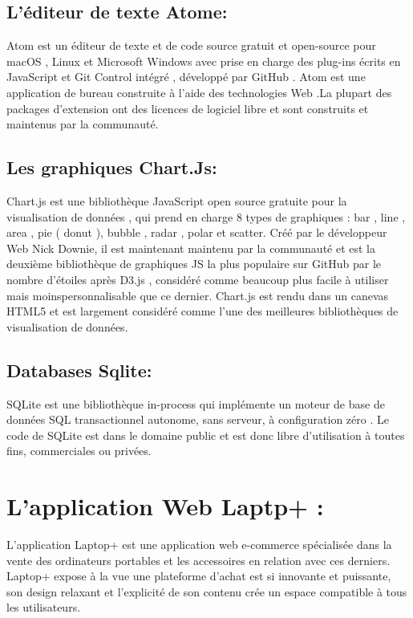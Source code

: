 \documentclass[a4paper,12pt]{report}
\begin{document}
\begin{doublespace}
\begin{doublespace}
\begin{doublespace}
\begin{doublespace}
\begin{doublespace}
\begin{doublespace}
\subsection{L'éditeur de texte Atome:} 
 \begin{figure}[H]
\end{figure}
 Atom est un éditeur de texte et de code source gratuit et open-source pour macOS , Linux et Microsoft Windows avec prise en charge des plug-ins écrits en JavaScript et Git Control intégré , développé par GitHub . Atom est une application de bureau construite à l'aide des technologies Web .La plupart des packages d'extension ont des licences de logiciel libre et sont construits et maintenus par la communauté. 
  \newpage
\subsection{ Les graphiques Chart.Js:}  
   \begin{figure}[H]
\end{figure}
 Chart.js est une bibliothèque JavaScript open source gratuite pour la visualisation de données , qui prend en charge 8 types de graphiques : bar , line , area , pie ( donut ), bubble , radar , polar et scatter. Créé par le développeur Web  Nick Downie, il est maintenant maintenu par la communauté et est la deuxième bibliothèque de graphiques JS la plus populaire sur GitHub par le nombre d'étoiles après D3.js , considéré comme beaucoup plus facile à utiliser mais moinspersonnalisable que ce dernier. Chart.js est rendu dans un canevas HTML5 et est largement considéré comme l'une des meilleures bibliothèques de visualisation de données. 
\subsection{Databases Sqlite:}
\begin{figure}[H]
\end{figure}
SQLite est une bibliothèque in-process qui implémente un moteur de base de données SQL transactionnel autonome, sans serveur, à configuration zéro . Le code de SQLite est dans le domaine public et est donc libre d'utilisation à toutes fins, commerciales ou privées.
\newpage
\section{L'application Web Laptp+ :} 
L'application Laptop+ est une application web e-commerce spécialisée dans la vente des ordinateurs portables et les accessoires en relation avec ces derniers. \\Laptop+ expose à la vue une plateforme d'achat est si innovante et puissante, son design relaxant et l’explicité de son contenu crée un espace compatible à tous les utilisateurs.


\end{doublespace}
\end{doublespace}
\end{doublespace}
\end{doublespace}
\end{doublespace}
\end{doublespace}
\end{document}

